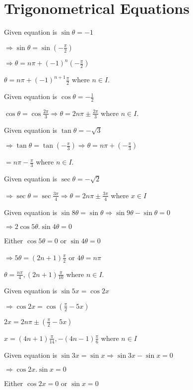 \chapter{Trigonometrical Equations}
\startitemize[n, 1*broad]
\item Given equation is $\sin\theta = -1$

  $\Rightarrow \sin\theta = \sin\left(-\frac{\pi}{2}\right)$

  $\Rightarrow \theta = n\pi + (-1)^n\left(-\frac{\pi}{2}\right)$

  $\theta = n\pi + (-1)^{n +1}\frac{\pi}{2}$ where $n\in I.$
\item Given equation is $\cos\theta = -\frac{1}{2}$

  $\cos\theta = \cos\frac{2\pi}{3} \Rightarrow \theta = 2n\pi \pm \frac{2\pi}{3}$ where $n\in I.$
\item Given equation is $\tan\theta = -\sqrt{3}$

  $\Rightarrow \tan\theta = \tan\left(-\frac{\pi}{3}\right) \Rightarrow \theta = n\pi + \left(-\frac{\pi}{3}\right)$

  $= n\pi - \frac{\pi}{3}$ where $n\in I.$
\item Given equation is $\sec\theta = -\sqrt{2}$

  $\Rightarrow \sec\theta = \sec\frac{3\pi}{4}\Rightarrow \theta = 2n\pi\pm \frac{3\pi}{4}$ where $x\in I$
\item Given equation is $\sin8\theta = \sin\theta \Rightarrow \sin9\theta - \sin\theta = 0$

  $\Rightarrow 2\cos5\theta.\sin4\theta = 0$

  Either $\cos5\theta = 0$ or $\sin4\theta = 0$

  $\Rightarrow 5\theta = (2n + 1)\frac{\pi}{2}$ or $4\theta = n\pi$

  $\theta = \frac{n\pi}{4}, (2n + 1)\frac{\pi}{10}$ where $n\in I.$
\item Given equation is $\sin5x = \cos2x$

  $\Rightarrow \cos2x = \cos\left(\frac{\pi}{2} - 5x\right)$

  $2x = 2n\pi \pm \left(\frac{\pi}{2} - 5x\right)$

  $x = (4n + 1)\frac{\pi}{14}, -(4n - 1)\frac{\pi}{6}$ where $n\in I$
\item Given equation is $\sin3x = \sin x \Rightarrow \sin3x - \sin x= 0$

  $\Rightarrow \cos2x.\sin x = 0$

  Either $\cos2x = 0$ or $\sin x= 0$

